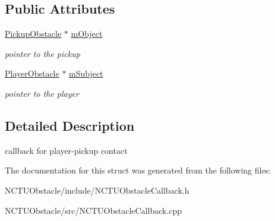 \subsection*{Public Attributes}
\begin{DoxyCompactItemize}
\item 
\hyperlink{class_n_c_t_u_1_1_pickup_obstacle}{Pickup\+Obstacle} $\ast$ \hyperlink{struct_n_c_t_u_1_1_pickup_contact_result_callback_ab8d5fdde1da18a6552b956223dabae4a}{m\+Object}\hypertarget{struct_n_c_t_u_1_1_pickup_contact_result_callback_ab8d5fdde1da18a6552b956223dabae4a}{}\label{struct_n_c_t_u_1_1_pickup_contact_result_callback_ab8d5fdde1da18a6552b956223dabae4a}

\begin{DoxyCompactList}\small\item\em pointer to the pickup \end{DoxyCompactList}\item 
\hyperlink{class_n_c_t_u_1_1_player_obstacle}{Player\+Obstacle} $\ast$ \hyperlink{struct_n_c_t_u_1_1_pickup_contact_result_callback_a132213ea28df353bdbf5d7cfb55a8d3d}{m\+Subject}\hypertarget{struct_n_c_t_u_1_1_pickup_contact_result_callback_a132213ea28df353bdbf5d7cfb55a8d3d}{}\label{struct_n_c_t_u_1_1_pickup_contact_result_callback_a132213ea28df353bdbf5d7cfb55a8d3d}

\begin{DoxyCompactList}\small\item\em pointer to the player \end{DoxyCompactList}\end{DoxyCompactItemize}


\subsection{Detailed Description}
callback for player-\/pickup contact 

The documentation for this struct was generated from the following files\+:\begin{DoxyCompactItemize}
\item 
N\+C\+T\+U\+Obstacle/include/N\+C\+T\+U\+Obstacle\+Callback.\+h\item 
N\+C\+T\+U\+Obstacle/src/N\+C\+T\+U\+Obstacle\+Callback.\+cpp\end{DoxyCompactItemize}
